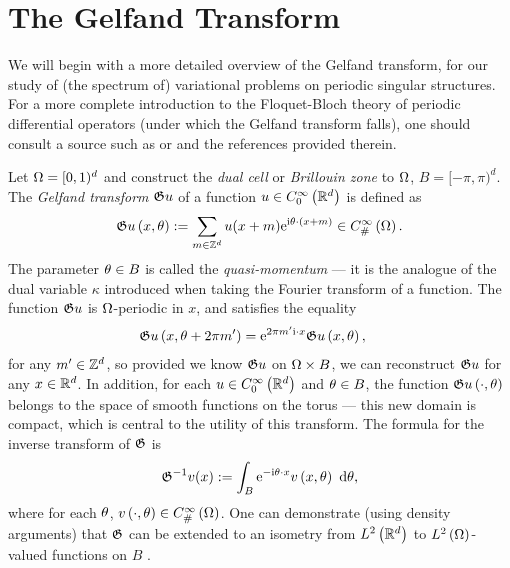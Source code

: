 \section{The Gelfand Transform} \label{sec:TP-GelfandTransform}
We will begin with a more detailed overview of the Gelfand transform, for our study of (the spectrum of) variational problems on periodic singular structures.
For a more complete introduction to the Floquet-Bloch theory of periodic differential operators (under which the Gelfand transform falls), one should consult a source such as \cite[section 7.3]{kuchment2001mathematics} or \cite{reed1978iv} and the references provided therein.

Let $\Omega=[0,1)^d$  and construct the \emph{dual cell} or \emph{Brillouin zone} to $\Omega$, $B=[-\pi,\pi)^d$.
The \emph{Gelfand transform} $\mathfrak{G} u$ of a function $u\in C^{\infty}_{0}\left( \mathbb{R}^d \right)$ is defined as
\begin{align*}
	\mathfrak{G} u\left( x,\theta \right) := \sum_{m\in\mathbb{Z}^d}u(x+m)\mathrm{e}^{\mathrm{i}\theta\cdot(x+m)} \in C^{\infty}_{\#}\left( \Omega \right).
\end{align*}
The parameter $\theta\in B$ is called the \emph{quasi-momentum} --- it is the analogue of the dual variable $\kappa$ introduced when taking the Fourier transform of a function.
The function $\mathfrak{G} u$ is $\Omega$-periodic in $x$, and satisfies the equality
\begin{align} \label{eq:GelfandTransform}
	\mathfrak{G} u\left( x,\theta+2\pi m' \right) &= \mathrm{e}^{2\pi m'\mathrm{i}\cdot x}\mathfrak{G} u\left( x,\theta \right),
\end{align}
for any $m'\in\mathbb{Z}^d$, so provided we know $\mathfrak{G} u$ on $\Omega\times B$, we can reconstruct $\mathfrak{G} u$ for any $x\in\mathbb{R}^d$.
In addition, for each $u\in C^{\infty}_{0}\left( \mathbb{R}^d \right)$ and $\theta\in B$, the function $\mathfrak{G} u\left( \cdot,\theta \right)$ belongs to the space of smooth functions on the torus --- this new domain is compact, which is central to the utility of this transform.
The formula for the inverse transform of $\mathfrak{G}$ is
\begin{align*}
	\mathfrak{G}^{-1}v (x) := \int_{B}\mathrm{e}^{-\mathrm{i}\theta\cdot x}v\left( x,\theta \right) \ \mathrm{d}\theta,
\end{align*}
where for each $\theta$, $v\left( \cdot,\theta \right)\in C^{\infty}_{\#}\left( \Omega \right)$.
One can demonstrate (using density arguments) that $\mathfrak{G}$ can be extended to an isometry from $L^2\left( \mathbb{R}^d \right)$ to $L^2\left( \Omega \right)$-valued functions on $B$ \cite[theorem 7.3]{kuchment2001mathematics}.


